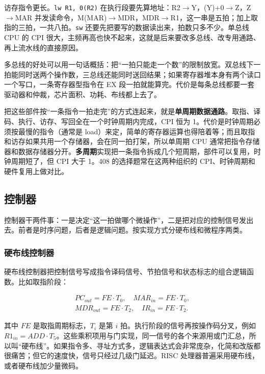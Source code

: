 访存指令更长。\texttt{lw R1, 0(R2)} 在执行段要先算地址：R2$\to$Y，(Y)+0$\to$Z，Z$\to$MAR 并发读命令，M(MAR)$\to$MDR，MDR$\to$R1，这一串是五拍；加上取指的三拍，一共八拍。\texttt{sw} 还要先把要写的数据读出来，拍数只多不少。单总线 CPU 的 CPI 很大，主频再高也快不起来，这就是后来要改多总线、改专用通路、再上流水线的直接原因。

多总线的好处可以用一句话概括：把“一拍只能走一个数”的限制放宽。双总线下一拍能同时送两个操作数，三总线还能同时送回结果；如果寄存器堆本身有两个读口一个写口，一条寄存器型指令在 EX 段一拍就能算完。代价是每条总线都要一套驱动器和仲裁，芯片面积、功耗、布线都上去了。

把这些部件按“一条指令一拍走完”的方式连起来，就是\textbf{单周期数据通路}。取指、译码、执行、访存、写回全在一个时钟周期内完成，CPI 恒为 1。代价是时钟周期必须按最慢的指令（通常是 load）来定，简单的寄存器运算也得陪着等；而且取指和访存如果共用一个存储器，会在同一拍打架，所以单周期 CPU 通常把指令存储器和数据存储器分开。\textbf{多周期}实现把一条指令拆成几个短周期，部件可以复用，时钟周期短了，但 CPI 大于 1。408 的选择题常在这两种组织的 CPI、时钟周期和硬件复用上做对比。

\subsection{控制器}

控制器干两件事：一是决定“这一拍做哪个微操作”，二是把对应的控制信号发出去。前者是时序问题，后者是逻辑问题。按实现方式分硬布线和微程序两类。

\newpage
\subsubsection{硬布线控制器}

硬布线控制器把控制信号写成指令译码信号、节拍信号和状态标志的组合逻辑函数。比如取指阶段：

\[
\begin{gathered}
PC_{out}=FE\cdot T_0,\quad MAR_{in}=FE\cdot T_0,\\
MDR_{out}=FE\cdot T_2,\quad IR_{in}=FE\cdot T_2.
\end{gathered}
\]

其中 $FE$ 是取指周期标志，$T_i$ 是第 $i$ 拍。执行阶段的信号再按操作码分叉，例如
\mbox{$R1_{in}=ADD\cdot T_5$}。这些乘积项用与门实现，同一信号的各个来源用或门汇总，所以叫“硬布线”。如果指令多、寻址方式多，逻辑表达式会非常庞杂，化简和改版都很痛苦；但它的速度快，信号只经过几级门延迟。RISC 处理器普遍采用硬布线，或者硬布线加少量微码。


